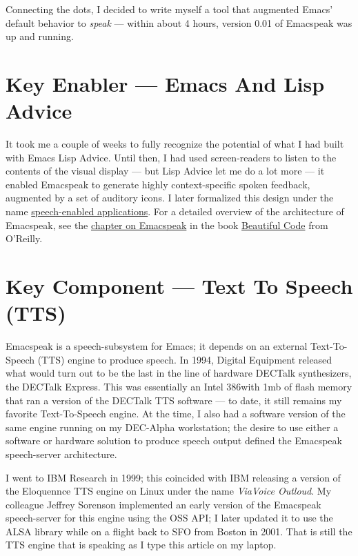 \documentclass[11pt]{article}
\begin{document}
Connecting the dots, I decided to write myself a tool that
augmented Emacs' default behavior to \emph{speak} — within about 4
hours, version 0.01 of Emacspeak was up and running.


\section{Key Enabler — Emacs And Lisp Advice}
\label{sec-3}

It took me a couple of weeks to fully recognize the potential of
what I had built with Emacs Lisp Advice. Until then, I had used
screen-readers to listen to the contents of the visual display —
but Lisp Advice let me do a lot more — it enabled Emacspeak to
generate highly context-specific spoken feedback, augmented by a
set of auditory icons. I later formalized this design under the
name \href{http://en.wikipedia.org/wiki/Self-voicing}{speech-enabled applications}. For a detailed overview of the
architecture of Emacspeak, see the \href{http://emacspeak.sourceforge.net/raman/publications/bc-emacspeak/publish-emacspeak-bc.html}{chapter on Emacspeak} in the
book \href{http://emacspeak.blogspot.com/2007/07/emacspeak-and-beautiful-code.html}{Beautiful Code} from O'Reilly.

\section{Key Component —  Text To Speech (TTS)}
\label{sec-4}

Emacspeak is a speech-subsystem for Emacs; it depends on an
external Text-To-Speech (TTS) engine to produce speech. In 1994,
Digital Equipment released what would turn out to be the last in
the line of hardware DECTalk synthesizers, the DECTalk
Express. This was essentially an Intel 386with 1mb of flash
memory that ran a version of the DECTalk TTS software — to date,
it still remains my favorite Text-To-Speech engine. At the time,
I also had a software version of the same engine running on my
DEC-Alpha workstation; the desire to use either a software or
hardware solution to produce speech output defined the Emacspeak
speech-server architecture.

I went to IBM Research in 1999; this coincided with IBM releasing
a version of the Eloquennce TTS engine on Linux under the name
\emph{ViaVoice Outloud}. My colleague Jeffrey Sorenson implemented an
early version of the Emacspeak speech-server for this engine
using the OSS API; I later updated it to use the ALSA library
while on a flight back to SFO from Boston in 2001. That is still
the TTS engine that is speaking as I type this article on my
laptop.
\end{document}
